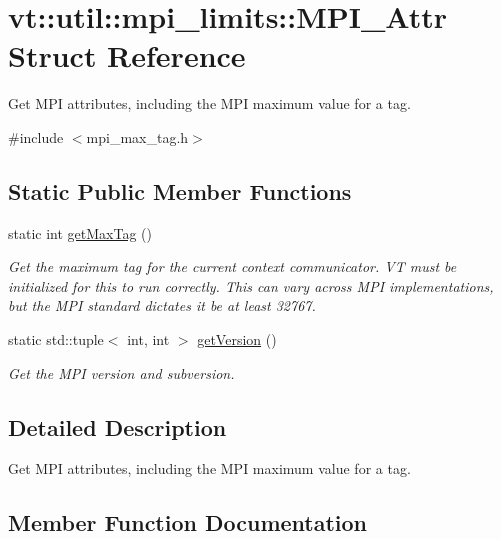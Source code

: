 \hypertarget{structvt_1_1util_1_1mpi__limits_1_1_m_p_i___attr}{}\section{vt\+:\+:util\+:\+:mpi\+\_\+limits\+:\+:M\+P\+I\+\_\+\+Attr Struct Reference}
\label{structvt_1_1util_1_1mpi__limits_1_1_m_p_i___attr}


Get M\+PI attributes, including the M\+PI maximum value for a tag.  




{\ttfamily \#include $<$mpi\+\_\+max\+\_\+tag.\+h$>$}

\subsection*{Static Public Member Functions}
\begin{DoxyCompactItemize}
\item 
static int \hyperlink{structvt_1_1util_1_1mpi__limits_1_1_m_p_i___attr_a3150f6a09a10554293f176074072ac2d}{get\+Max\+Tag} ()
\begin{DoxyCompactList}\small\item\em Get the maximum tag for the current context communicator. VT must be initialized for this to run correctly. This can vary across M\+PI implementations, but the M\+PI standard dictates it be at least 32767. \end{DoxyCompactList}\item 
static std\+::tuple$<$ int, int $>$ \hyperlink{structvt_1_1util_1_1mpi__limits_1_1_m_p_i___attr_ae56b450a99da5c631b22e8f84d5f3c25}{get\+Version} ()
\begin{DoxyCompactList}\small\item\em Get the M\+PI version and subversion. \end{DoxyCompactList}\end{DoxyCompactItemize}


\subsection{Detailed Description}
Get M\+PI attributes, including the M\+PI maximum value for a tag. 

\subsection{Member Function Documentation}
\mbox{\label{structvt_1_1util_1_1mpi__limits_1_1_m_p_i___attr_a3150f6a09a10554293f176074072ac2d}} 
